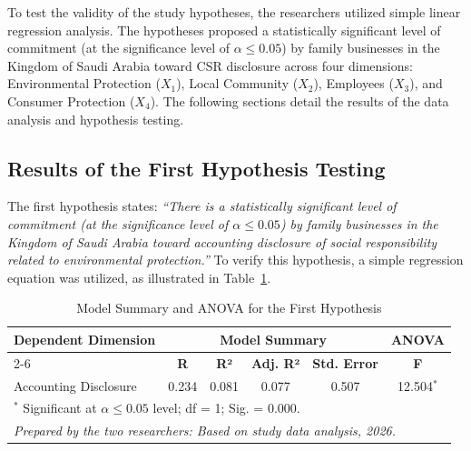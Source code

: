 \documentclass[10pt]{NSP1}
\begin{document}
To test the validity of the study hypotheses, the researchers utilized simple linear regression analysis. The hypotheses proposed a statistically significant level of commitment (at the significance level of $\alpha \leq 0.05$) by family businesses in the Kingdom of Saudi Arabia toward CSR disclosure across four dimensions: Environmental Protection ($X_1$), Local Community ($X_2$), Employees ($X_3$), and Consumer Protection ($X_4$). The following sections detail the results of the data analysis and hypothesis testing.

\subsection{Results of the First Hypothesis Testing}

The first hypothesis states: \emph{``There is a statistically significant level of commitment (at the significance level of $\alpha \leq 0.05$) by family businesses in the Kingdom of Saudi Arabia toward accounting disclosure of social responsibility related to environmental protection.''} To verify this hypothesis, a simple regression equation was utilized, as illustrated in Table~\ref{tab:h1}.

\begin{table}[H]
\centering
\caption{Model Summary and ANOVA for the First Hypothesis}
\label{tab:h1}
\vspace{5pt}
\small
\begin{tabular}{lccccc}
\hline
\multirow{2}{*}{\textbf{Dependent Dimension}} & \multicolumn{4}{c}{\textbf{Model Summary}} & \multicolumn{1}{c}{\textbf{ANOVA}} \\
\cline{2-6}
 & \textbf{R} & \textbf{R²} & \textbf{Adj. R²} & \textbf{Std. Error} & \textbf{F} \\
\hline
Accounting Disclosure & 0.234 & 0.081 & 0.077 & 0.507 & 12.504$^{*}$ \\
\hline
\multicolumn{6}{l}{\footnotesize $^{*}$ Significant at $\alpha \leq 0.05$ level; df = 1; Sig. = 0.000.} \\
\multicolumn{6}{l}{\footnotesize \textit{Prepared by the two researchers: Based on study data analysis, 2026.}} \\
\end{tabular}
\end{table}
\end{document}
